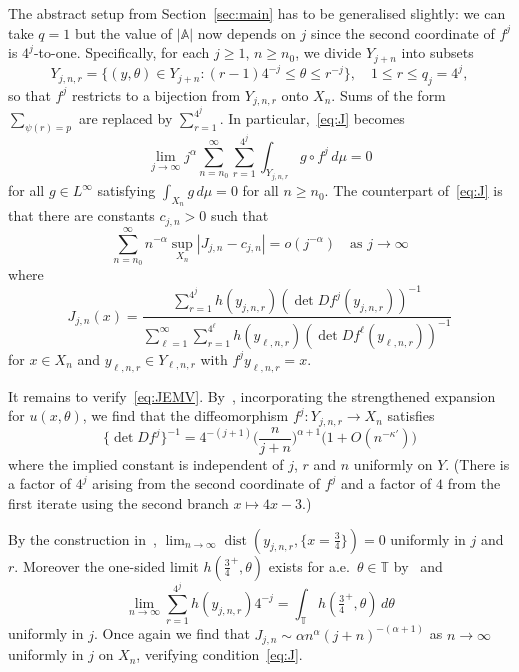 \documentclass[12pt]{article}
\numberwithin{equation}{section}
\newcommand{\T}{{\mathbb T}}
\newcommand{\bbA}{{\mathbb A}}
\newcommand{\dist}{\operatorname{dist}}
\begin{document}
\begin{example}
The abstract setup from Section~\ref{sec:main} has to be generalised slightly: we can take $q=1$ but the value of $|\bbA|$ now depends on $j$ since the second coordinate of $f^j$ is $4^j$-to-one.
Specifically, for each $j\ge1$, $n\ge n_0$, we divide 
$Y_{j+n}$ into subsets 
\[
 Y_{j,n,r}=\{(y,\theta)\in Y_{j+n}: (r-1) 4^{-j}\le \theta \le r^{-j}\}, \quad
 1\le r\le q_j=4^j,
\]
so that $f^j$ restricts to a bijection from $Y_{j,n,r}$ onto $X_n$.
Sums of the form $\sum_{\psi(r)=p}$ are replaced by $\sum_{r=1}^{4^j}$.
In particular,~\eqref{eq:J} becomes
\begin{equation} \label{eq:tildeEMV}
\lim_{j\to\infty}j^\alpha\sum_{n=n_0}^\infty\sum_{r=1}^{4^j} \int_{Y_{j,n,r}}g\circ f^j\,d\mu=0
\end{equation}
for all $g\in L^\infty$ satisfying $\int_{X_n}g\,d\mu=0$ for all $n\ge n_0$.
The counterpart of~\eqref{eq:J} is
that there are constants
$c_{j,n}>0$ such that
\begin{equation} \label{eq:JEMV}
\sum_{n=n_0}^\infty n^{-\alpha}\sup_{X_n}|J_{j,n}-c_{j,n}|=o(j^{-\alpha})
\quad\text{as $j\to\infty$}
\end{equation}
where
\[
J_{j,n}(x)=\frac{\sum_{r=1}^{4^j}h(y_{j,n,r})(\det Df^j(y_{j,n,r}))^{-1}}
{\sum_{\ell=1}^\infty\sum_{r=1}^{4^\ell} h(y_{\ell,n,r})(\det Df^\ell(y_{\ell,n,r}))^{-1}}
\]
for $x\in X_n$ and $y_{\ell,n,r}\in Y_{\ell,n,r}$ with $f^jy_{\ell,n,r}=x$.

It remains to verify~\eqref{eq:JEMV}.
By~\cite[Lemma~2.9]{EMV21}, incorporating the strengthened expansion for $u(x,\theta)$, we find that
the diffeomorphism $f^j:Y_{j,n,r}\to X_n$ satisfies
\[
        \{\det Df^j\}^{-1}= 4^{-(j+1)} \Big(\frac{n}{j+n}\Big)^{\alpha+1}
\big(1+O(n^{-\kappa'})\big)
\]
where the implied constant is independent of $j$, $r$ and $n$ uniformly on $Y$.
(There is a factor of $4^j$ arising from the second coordinate of  $f^j$ and a factor of $4$ from the first iterate using the second branch $x\mapsto 4x-3$.)

By the construction in~\cite{EMV21}, $\lim_{n\to\infty}\dist(y_{j,n,r},\{x=\tfrac34\})=0$ uniformly in $j$ and $r$. Moreover
the one-sided limit $h(\tfrac34^+,\theta)$ exists for a.e.\ $\theta\in\T$
by~\cite[Proposition~4.11]{EMV21} and
\[
 \lim_{n\to\infty}\sum_{r=1}^{4^j}h(y_{j,n,r})4^{-j} = \int_\T h(\tfrac34^+,\theta)\,d\theta 
\]
uniformly in $j$.
Once again we find that $J_{j,n}\sim\alpha n^\alpha(j+n)^{-(\alpha+1)}$ as $n\to\infty$ uniformly in $j$ on $X_n$, verifying condition~\eqref{eq:J}.
\end{example}
\end{document}
